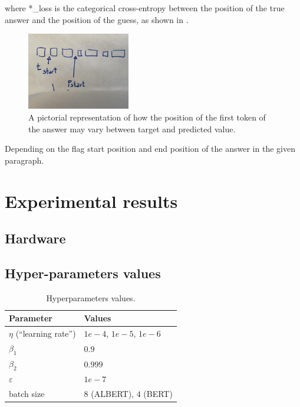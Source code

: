 \documentclass[10pt,hidelinks]{article}
\def\colOne{white}
\def\colTwo{pblue!10}
\def\colHea{pblue!35}
\begin{document}
 where *\_loss is the categorical cross-entropy between the position of the true answer and the position of the guess, as shown in .

\begin{figure}[ht!]
	\centering
	\includegraphics[width=0.4\textwidth]{pics/loss.jpg}
	\caption{A pictorial representation of how the position of the first token of the answer may vary between target and predicted value.}\label{fig:loss}
\end{figure}

Depending on the flag
start position and end position of the answer in the given paragraph.

\section{Experimental results}\label{sec:experimental_results}


\subsection{Hardware}


\subsection{Hyper-parameters values}

\begin{table}[ht!]
	\footnotesize\centering
	\rowcolors{2}{\colOne}{\colTwo}
	\begin{tabular}{|l|p{60mm}|}
		\hline\rowcolor{\colHea} Parameter & Values\\\hline\hline
		$ \eta $ (``learning rate'') & $ 1e-4$, $1e-5$, $1e-6$ \\
		$\beta_1$ & $0.9$\\
		$\beta_2$ & $0.999$\\
		$\varepsilon$ & $1e-7$\\
		batch size & $8$ (ALBERT), $4$ (BERT)\\
		\end{tabular}
	\caption{Hyperparameters values.}\label{tab:gridSearchParamCl}
\end{table}
\end{document}
